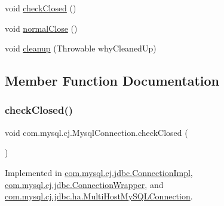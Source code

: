 \begin{DoxyCompactItemize}
\item 
void \mbox{\hyperlink{interfacecom_1_1mysql_1_1cj_1_1_mysql_connection_a49756db5417b86971e0f2bb17ae71630}{check\+Closed}} ()
\item 
void \mbox{\hyperlink{interfacecom_1_1mysql_1_1cj_1_1_mysql_connection_a15e693e5e3b333c7a29b238b510734ab}{normal\+Close}} ()
\item 
void \mbox{\hyperlink{interfacecom_1_1mysql_1_1cj_1_1_mysql_connection_a20ea00c4098425d1caa0ab9fbf28338c}{cleanup}} (Throwable why\+Cleaned\+Up)
\end{DoxyCompactItemize}


\subsection{Member Function Documentation}
\mbox{\label{interfacecom_1_1mysql_1_1cj_1_1_mysql_connection_a49756db5417b86971e0f2bb17ae71630}} 
\subsubsection{\texorpdfstring{check\+Closed()}{checkClosed()}}
{\footnotesize\ttfamily void com.\+mysql.\+cj.\+Mysql\+Connection.\+check\+Closed (\begin{DoxyParamCaption}{ }\end{DoxyParamCaption})}



Implemented in \mbox{\hyperlink{classcom_1_1mysql_1_1cj_1_1jdbc_1_1_connection_impl_a33d9303b2ac912fc285f5c2215d568d1}{com.\+mysql.\+cj.\+jdbc.\+Connection\+Impl}}, \mbox{\hyperlink{classcom_1_1mysql_1_1cj_1_1jdbc_1_1_connection_wrapper_a071813afb9b56c08fa663b1d429c8def}{com.\+mysql.\+cj.\+jdbc.\+Connection\+Wrapper}}, and \mbox{\hyperlink{classcom_1_1mysql_1_1cj_1_1jdbc_1_1ha_1_1_multi_host_my_s_q_l_connection_aaca35ad8d7fae96cb649f1f14f2dbc13}{com.\+mysql.\+cj.\+jdbc.\+ha.\+Multi\+Host\+My\+S\+Q\+L\+Connection}}.

\mbox{\label{interfacecom_1_1mysql_1_1cj_1_1_mysql_connection_a20ea00c4098425d1caa0ab9fbf28338c}} 
